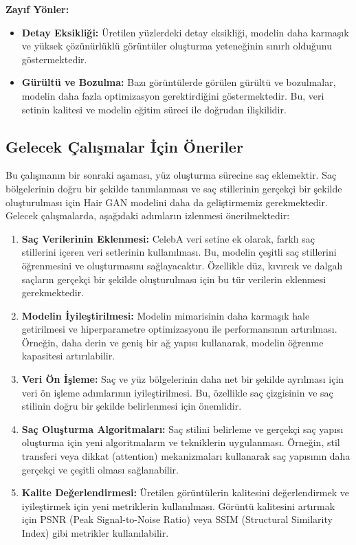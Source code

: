\documentclass[12pt]{article}
\begin{document}
\textbf{Zayıf Yönler:}
\begin{itemize}
    \item \textbf{Detay Eksikliği:} Üretilen yüzlerdeki detay eksikliği, modelin daha karmaşık ve yüksek çözünürlüklü görüntüler oluşturma yeteneğinin sınırlı olduğunu göstermektedir.
    \item \textbf{Gürültü ve Bozulma:} Bazı görüntülerde görülen gürültü ve bozulmalar, modelin daha fazla optimizasyon gerektirdiğini göstermektedir. Bu, veri setinin kalitesi ve modelin eğitim süreci ile doğrudan ilişkilidir.
\end{itemize}

\subsection{Gelecek Çalışmalar İçin Öneriler}
Bu çalışmanın bir sonraki aşaması, yüz oluşturma sürecine saç eklemektir. Saç bölgelerinin doğru bir şekilde tanımlanması ve saç stillerinin gerçekçi bir şekilde oluşturulması için Hair GAN modelini daha da geliştirmemiz gerekmektedir. Gelecek çalışmalarda, aşağıdaki adımların izlenmesi önerilmektedir:

\begin{enumerate}
    \item \textbf{Saç Verilerinin Eklenmesi:} CelebA veri setine ek olarak, farklı saç stillerini içeren veri setlerinin kullanılması. Bu, modelin çeşitli saç stillerini öğrenmesini ve oluşturmasını sağlayacaktır. Özellikle düz, kıvırcık ve dalgalı saçların gerçekçi bir şekilde oluşturulması için bu tür verilerin eklenmesi gerekmektedir.
    \item \textbf{Modelin İyileştirilmesi:} Modelin mimarisinin daha karmaşık hale getirilmesi ve hiperparametre optimizasyonu ile performansının artırılması. Örneğin, daha derin ve geniş bir ağ yapısı kullanarak, modelin öğrenme kapasitesi artırılabilir.
    \item \textbf{Veri Ön İşleme:} Saç ve yüz bölgelerinin daha net bir şekilde ayrılması için veri ön işleme adımlarının iyileştirilmesi. Bu, özellikle saç çizgisinin ve saç stilinin doğru bir şekilde belirlenmesi için önemlidir.
    \item \textbf{Saç Oluşturma Algoritmaları:} Saç stilini belirleme ve gerçekçi saç yapısı oluşturma için yeni algoritmaların ve tekniklerin uygulanması. Örneğin, stil transferi veya dikkat (attention) mekanizmaları kullanarak saç yapısının daha gerçekçi ve çeşitli olması sağlanabilir.
    \item \textbf{Kalite Değerlendirmesi:} Üretilen görüntülerin kalitesini değerlendirmek ve iyileştirmek için yeni metriklerin kullanılması. Görüntü kalitesini artırmak için PSNR (Peak Signal-to-Noise Ratio) veya SSIM (Structural Similarity Index) gibi metrikler kullanılabilir.
\end{enumerate}
\end{document}
